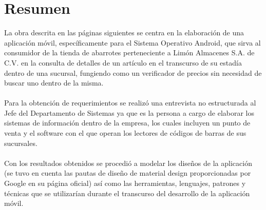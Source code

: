 \chapter*{Resumen}
La obra descrita en las páginas siguientes se centra en la elaboración de una aplicación móvil, específicamente para el Sistema Operativo Android, que sirva al consumidor de la tienda de abarrotes perteneciente a Limón Almacenes S.A. de C.V. en la consulta de detalles de un artículo en el transcurso de su estadía dentro de una sucursal, fungiendo como un verificador de precios sin necesidad de buscar uno dentro de la misma.
\\ \\
Para la obtención de requerimientos se realizó una entrevista no estructurada al Jefe del Departamento de Sistemas ya que es la persona a cargo de elaborar los sistemas de información dentro de la empresa, los cuales incluyen un punto de venta y el software con el que operan los lectores de códigos de barras de sus sucursales.
\\ \\
Con los resultados obtenidos se procedió a modelar los diseños de la aplicación (se tuvo en cuenta las pautas de diseño de material design proporcionadas por Google en su página oficial) así como las herramientas, lenguajes, patrones y técnicas que se utilizarían durante el transcurso del desarrollo de la aplicación móvil.